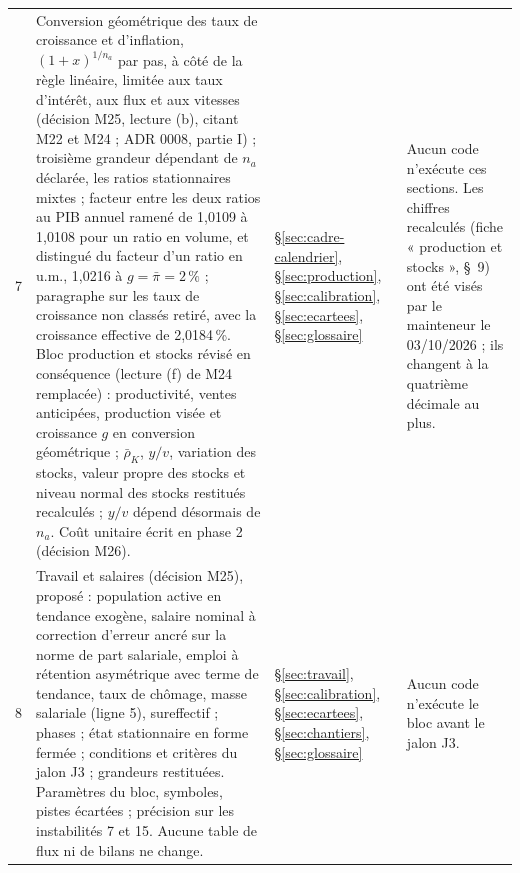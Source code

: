 \documentclass[11pt,a4paper]{article}
\begin{document}
\begin{center}
\begin{longtable}{p{0.5cm}>{\raggedright\arraybackslash}p{6.3cm}>{\raggedright\arraybackslash}p{2.1cm}>{\raggedright\arraybackslash}p{5.8cm}}
7 & Conversion géométrique des taux de croissance et d'inflation, $(1 + x)^{1/n_a}$ par pas, à côté de la règle linéaire, limitée aux taux d'intérêt, aux flux et aux vitesses (décision M25, lecture (b), citant M22 et M24 ; ADR 0008, partie I) ; troisième grandeur dépendant de $n_a$ déclarée, les ratios stationnaires mixtes ; facteur entre les deux ratios au PIB annuel ramené de 1,0109 à 1,0108 pour un ratio en volume, et distingué du facteur d'un ratio en u.m., 1,0216 à $g = \bar\pi = 2\,\%$ ; paragraphe sur les taux de croissance non classés retiré, avec la croissance effective de 2,0184\,\%. Bloc production et stocks révisé en conséquence (lecture (f) de M24 remplacée) : productivité, ventes anticipées, production visée et croissance $g$ en conversion géométrique ; $\bar\rho_K$, $y/v$, variation des stocks, valeur propre des stocks et niveau normal des stocks restitués recalculés ; $y/v$ dépend désormais de $n_a$. Coût unitaire écrit en phase 2 (décision M26). & \S\ref{sec:cadre-calendrier}, \S\ref{sec:production}, \S\ref{sec:calibration}, \S\ref{sec:ecartees}, \S\ref{sec:glossaire} & Aucun code n'exécute ces sections. Les chiffres recalculés (fiche « production et stocks », \S~9) ont été visés par le mainteneur le 03/10/2026 ; ils changent à la quatrième décimale au plus.\\
8 & Travail et salaires (décision M25), proposé : population active en tendance exogène, salaire nominal à correction d'erreur ancré sur la norme de part salariale, emploi à rétention asymétrique avec terme de tendance, taux de chômage, masse salariale (ligne 5), sureffectif ; phases ; état stationnaire en forme fermée ; conditions et critères du jalon J3 ; grandeurs restituées. Paramètres du bloc, symboles, pistes écartées ; précision sur les instabilités 7 et 15. Aucune table de flux ni de bilans ne change. & \S\ref{sec:travail}, \S\ref{sec:calibration}, \S\ref{sec:ecartees}, \S\ref{sec:chantiers}, \S\ref{sec:glossaire} & Aucun code n'exécute le bloc avant le jalon J3.\\

\end{longtable}
\end{center}
\end{document}
